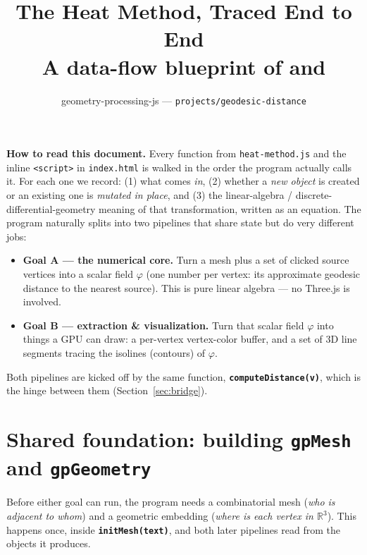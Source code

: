 \documentclass[11pt]{article}
\title{\textbf{The Heat Method, Traced End to End}\\[2pt]
\large A data-flow blueprint of \code{geodesic-distance/heat-method.js} and \code{index.html}}
\author{geometry-processing-js --- \texttt{projects/geodesic-distance}}
\date{}
\newcommand{\code}[1]{\texttt{#1}}
\newcommand{\func}[1]{\texttt{\textbf{#1}}}
\newcommand{\R}{\mathbb{R}}
\begin{document}
\maketitle

\vspace{-1.2em}
\begin{center}
\begin{minipage}{0.9\textwidth}
\small
\textbf{How to read this document.} Every function from \code{heat-method.js} and the
inline \code{<script>} in \code{index.html} is walked in the order the program actually
calls it. For each one we record: (1) what comes \emph{in}, (2) whether a \emph{new object}
is created or an existing one is \emph{mutated in place}, and (3) the linear-algebra /
discrete-differential-geometry meaning of that transformation, written as an equation. The
program naturally splits into two pipelines that share state but do very different jobs:

\begin{itemize}[leftmargin=1.4em]
  \item \textbf{Goal A --- the numerical core.} Turn a mesh plus a set of clicked source
    vertices into a scalar field $\varphi$ (one number per vertex: its approximate geodesic
    distance to the nearest source). This is pure linear algebra --- no Three.js is involved.
  \item \textbf{Goal B --- extraction \& visualization.} Turn that scalar field $\varphi$
    into things a GPU can draw: a per-vertex vertex-color buffer, and a set of 3D line
    segments tracing the isolines (contours) of $\varphi$.
  \end{itemize}
Both pipelines are kicked off by the same function, \func{computeDistance(v)}, which is the
hinge between them (Section~\ref{sec:bridge}).
\end{minipage}
\end{center}

\tableofcontents

\section{Shared foundation: building \code{gpMesh} and \code{gpGeometry}}
\label{sec:foundation}

Before either goal can run, the program needs a combinatorial mesh (\emph{who is adjacent to
whom}) and a geometric embedding (\emph{where is each vertex in $\R^3$}). This happens once,
inside \func{initMesh(text)}, and both later pipelines read from the objects it produces.
\end{document}
